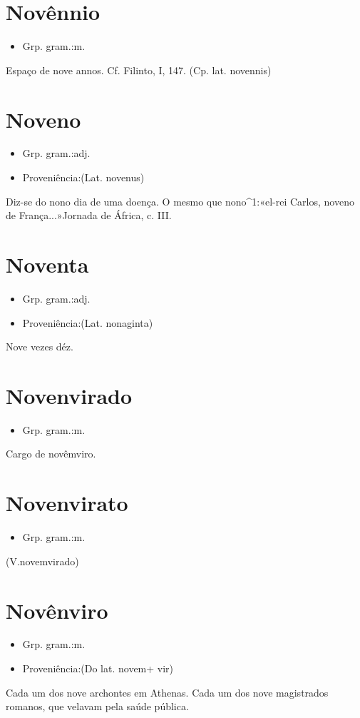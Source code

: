 \section{Novênnio}
\begin{itemize}
\item {Grp. gram.:m.}
\end{itemize}
Espaço de nove annos. Cf. Filinto, I, 147.
(Cp. lat. \textunderscore novennis\textunderscore )
\section{Noveno}
\begin{itemize}
\item {Grp. gram.:adj.}
\end{itemize}
\begin{itemize}
\item {Proveniência:(Lat. \textunderscore novenus\textunderscore )}
\end{itemize}
Diz-se do nono dia de uma doença.
O mesmo que \textunderscore nono\textunderscore ^1:«\textunderscore el-rei Carlos, noveno de França...\textunderscore »\textunderscore Jornada de África\textunderscore , c. III.
\section{Noventa}
\begin{itemize}
\item {Grp. gram.:adj.}
\end{itemize}
\begin{itemize}
\item {Proveniência:(Lat. \textunderscore nonaginta\textunderscore )}
\end{itemize}
Nove vezes déz.
\section{Novenvirado}
\begin{itemize}
\item {Grp. gram.:m.}
\end{itemize}
Cargo de novêmviro.
\section{Novenvirato}
\begin{itemize}
\item {Grp. gram.:m.}
\end{itemize}
(V.novemvirado)
\section{Novênviro}
\begin{itemize}
\item {Grp. gram.:m.}
\end{itemize}
\begin{itemize}
\item {Proveniência:(Do lat. \textunderscore novem\textunderscore  + \textunderscore vir\textunderscore )}
\end{itemize}
Cada um dos nove archontes em Athenas.
Cada um dos nove magistrados romanos, que velavam pela saúde pública.
